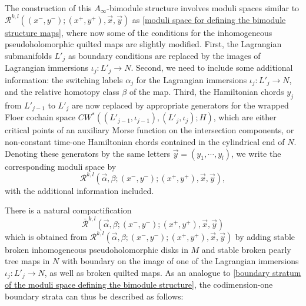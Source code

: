 \documentclass{amsart}
\numberwithin{equation}{section}
\numberwithin{figure}{section}
\begin{document}
	The construction of this $A_{\infty}$-bimodule structure involves moduli spaces similar to $\mathcal{R}^{k, l}((x^{-}, y^{-}); (x^{+}, y^{+}), \vec{x}, \vec{y})$ as \eqref{moduli space for defining the bimodule structure maps}, where now some of the conditions for the inhomogeneous pseudoholomorphic quilted maps are slightly modified. First, the Lagrangian submanifolds $L'_{j}$ as boundary conditions are replaced by the images of Lagrangian immersions $\iota_{j}: L'_{j} \to N$. Second, we need to include some additional information: the switching labels $\alpha_{j}$ for the Lagrangian immersions $\iota_{j}: L'_{j} \to N$, and the relative homotopy class $\beta$ of the map. Third, the Hamiltonian chords $y_{j}$ from $L'_{j-1}$ to $L'_{j}$ are now replaced by appropriate generators for the wrapped Floer cochain space $CW^{*}((L'_{j-1}, \iota_{j-1}), (L'_{j}, \iota_{j}); H)$, which are either critical points of an auxiliary Morse function on the intersection components, or non-constant time-one Hamiltonian chords contained in the cylindrical end of $N$. Denoting these generators by the same letters $\vec{y} = (y_{1}, \cdots, y_{l})$, we write the corresponding moduli space by
\begin{equation*}
\mathcal{R}^{k, l}(\vec{\alpha}, \beta; (x^{-}, y^{-}); (x^{+}, y^{+}), \vec{x}, \vec{y}),
\end{equation*}
with the additional information included. \par
	There is a natural compactification
\begin{equation*}
\bar{\mathcal{R}}^{k, l}(\vec{\alpha}, \beta; (x^{-}, y^{-}); (x^{+}, y^{+}), \vec{x}, \vec{y})
\end{equation*}
which is obtained from $\mathcal{R}^{k, l}(\vec{\alpha}, \beta; (x^{-}, y^{-}); (x^{+}, y^{+}), \vec{x}, \vec{y})$ by adding stable broken inhomogeneous pseudoholomorphic disks in $M$ and stable broken pearly tree maps in $N$ with boundary on the image of one of the Lagrangian immersions $\iota_{j}: L'_{j} \to N$, as well as broken quilted maps. As an analogue to \eqref{boundary stratum of the moduli space defining the bimodule structure}, the codimension-one boundary strata can thus be described as follows: 
\end{document}
